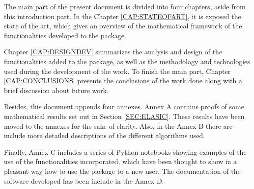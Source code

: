 The main part of the present document is divided into four chapters, aside from this introduction part. In the Chapter \ref{CAP:STATEOFART}, it is exposed the state of the art, which gives an overview of the mathematical framework of the functionalities developed to the package.

Chapter \ref{CAP:DESIGNDEV} summarizes the analysis and design of the functionalities added to the package, as well as the methodology and technologies used during the development of the work. To finish the main part, Chapter \ref{CAP:CONCLUSIONS} presents the conclusions of the work done along with a brief discussion about future work.

Besides, this document appends four annexes. Annex A contains proofs of some mathematical results set out in Section \ref{SEC:ELASIC}. These results have been moved to the annexes for the sake of clarity. Also, in the Annex B there are include more detailed descriptions of the different algorithms used.

Finally, Annex C includes a series of Python notebooks showing examples of the use of the functionalities incorporated, which have been thought to show in a pleasant way how to use the package to a new user. The documentation of the software developed has been include in the Annex D.
